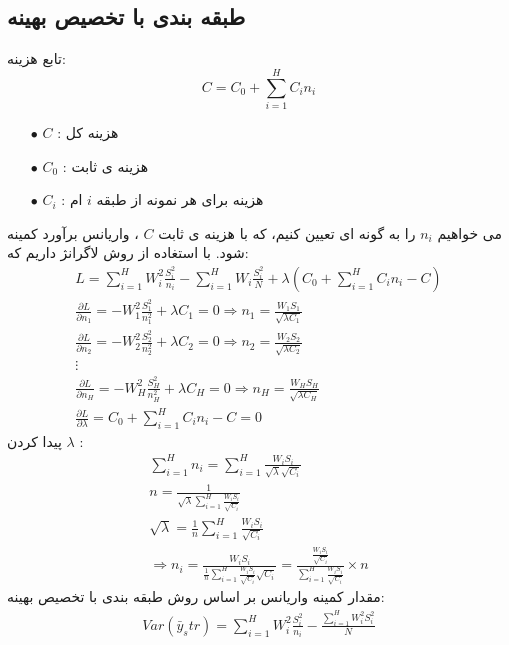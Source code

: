 \begin{enumerate}
	\subsection*{طبقه بندی با تخصیص بهینه}
	تابع هزینه:
	\begin{equation*}
		C=C_0+\sum_{i=1}^{H}C_in_i
	\end{equation*}
	\begin{itemize}
		\item[$\bullet$] $C$ :
		هزینه کل
		\item[$\bullet$] $C_0$ :
		هزینه ی ثابت
		\item[$\bullet$] $C_i$ :
		هزینه برای هر نمونه از طبقه 
		$i$
		ام
	\end{itemize}
	می خواهیم 
	$n_i$
	را به گونه ای تعیین کنیم، که با هزینه ی ثابت
	$C$
	، واریانس برآورد کمینه شود. 
	با استغاده از روش لاگرانژ داریم که:
	\begin{gather*}
		L=\sum_{i=1}^{H}W_i^2 \frac{S_i^2}{n_i}-\sum_{i=1}^{H}W_i\frac{S_i^2}{N}+\lambda(C_0+\sum_{i=1}^{H}C_in_i-C)
		\\
		\frac{\partial L}{\partial n_1}=-W_1^2\frac{S_1^2}{n_1^2}+\lambda C_1=0 
		\Rightarrow n_1=\frac{W_1S_1}{\sqrt{\lambda C_1}}
		\\
		\frac{\partial L}{\partial n_2}=-W_2^2\frac{S_2^2}{n_2^2}+\lambda C_2=0 
		\Rightarrow n_2=\frac{W_2S_2}{\sqrt{\lambda C_2}}
		\\
		\vdots \\
		\frac{\partial L}{\partial n_H}=-W_H^2\frac{S_H^2}{n_H^2}+\lambda C_H=0 
		\Rightarrow n_H=\frac{W_HS_H}{\sqrt{\lambda C_H}}
		\\
		\frac{\partial L}{\partial \lambda}=C_0+\sum_{i=1}^{H}C_in_i-C=0
		\end{gather*}
		پیدا کردن 
		$\lambda$
		:
		\begin{gather*}
			\sum_{i=1}^{H}n_i=\sum_{i=1}^{H}\frac{W_iS_i} {\sqrt{\lambda} \sqrt{C_i} } \\
			n=\frac{1}{\sqrt{\lambda}\sum_{i=1}^{H}\frac{W_iS_i}{\sqrt{C_i}}  } \\
			\sqrt{\lambda}=\frac{1}{n}\sum_{i=1}^{H}\frac{W_iS_i}{\sqrt{C_i}} \\
			\Rightarrow n_i=\frac{W_iS_i}{\frac{1}{n}\sum_{i=1}^{H}\frac{W_iS_i}{\sqrt{C_i}}\sqrt{C_i}}
			=\frac{\frac{W_iS_i}{\sqrt{C_i}}}{\sum_{i=1}^{H}\frac{W_iS_i}{\sqrt{C_i}}}\times n
		\end{gather*}
		مقدار کمینه واریانس بر اساس روش طبقه بندی با تخصیص بهینه:
		\begin{multline*}
			Var(\bar{y}_str)=
			\sum_{i=1}^{H}W_i^2\frac{S_i^2}{n_i}-\frac{\sum_{i=1}^{H}W_i^2S_i^2}{N}

\end{multline*}
\end{enumerate}
